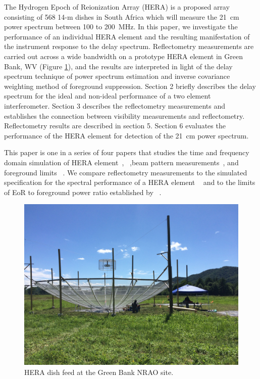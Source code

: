 \documentclass[twocolumn]{emulateapj}
\begin{document}
    \indent The Hydrogen Epoch of Reionization Array (HERA) is a proposed array
    consisting of 568 14-m dishes in South Africa which will measure the 21~cm
    power spectrum between 100 to 200~MHz.
    In this paper, we investigate the performance of an individual HERA element and
    the resulting manifestation of the instrument response to the delay spectrum.
    Reflectometry measurements  are carried out across a wide bandwidth on a
    prototype HERA element in Green Bank, WV (Figure \ref{fig:heradish}), and the
    results are interpreted in light of the delay spectrum technique of power
    spectrum estimation and inverse covariance weighting method of foreground
    suppression. Section 2 briefly describes the delay spectrum for the ideal and
    non-ideal performance of a two element interferometer. Section 3 describes the
    reflectometry measurements and establishes the connection between visibility
    measurements and reflectometry. Reflectometry results are described in section
    5. Section 6 evaluates the performance of the HERA element for detection of the
    21~cm power spectrum.
    
    This paper is one in a series of four papers that studies the time and frequency domain simulation of  HERA element~\citep{Ewall-Wice_et_al2016}, ~\citep{ddboer_et_al2016},beam pattern measurements~\citep{Neben_et_al2016}, and foreground limits ~\citep{Thyagarajan_et_al2016}. We compare 
    reflectometry measurements to the simulated specification for the spectral performance of a HERA element ~\citep{ddboer_et_al2016} and to the limits of EoR to foreground power ratio established by ~\citep{Thyagarajan_et_al2016}. 
    \begin{figure}
    \centering
    \includegraphics[trim={2cm 20cm 30cm 15cm},clip, totalheight=0.3\textheight]{plots/heradish.jpg}
    \caption{HERA dish feed at the Green Bank NRAO site.}
    \label{fig:heradish}
    \end{figure}
    
\end{document}
